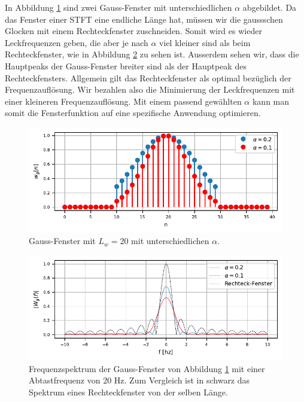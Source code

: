 In Abbildung \ref{sonogramm:gausstime} sind zwei Gauss-Fenster mit unterschiedlichen 
$\alpha$ abgebildet.
Da das Fenster einer STFT eine endliche Länge hat, müssen wir die gaussschen Glocken 
mit einem Rechteckfenster zuschneiden. 
Somit wird es wieder Leckfrequenzen geben, die aber je nach $\alpha$ viel kleiner sind
als beim Rechteckfenster, wie in Abbildung \ref{sonogramm:gaussfreq} zu sehen ist.
Ausserdem sehen wir, dass die Hauptpeaks der Gauss-Fenster breiter sind als der 
Hauptpeak des Rechteckfensters.
Allgemein gilt das Rechteckfenster als optimal bezüglich der Frequenzauflösung.
Wir bezahlen also die Minimierung der Leckfrequenzen mit einer kleineren Frequenzauflösung. 
Mit einem passend gewählten $\alpha$ kann man somit die Fensterfunktion auf eine spezifische
Anwendung optimieren.

\begin{figure}
    \centering
    \includegraphics{papers/sonogramm/images/gauss_time.pdf}
    \caption{Gauss-Fenster mit $L_w = 20$ mit unterschiedlichen $\alpha$.
    \label{sonogramm:gausstime}
    }
\end{figure}

\begin{figure}
    \centering
    \includegraphics{papers/sonogramm/images/gauss_freq.pdf}
    \caption{Frequenzspektrum der Gauss-Fenster von Abbildung \ref{sonogramm:gausstime}
    mit einer Abtastfrequenz von 20 Hz. Zum Vergleich ist in schwarz das Spektrum eines Rechteckfenster 
    von der selben Länge.
    \label{sonogramm:gaussfreq}
    }
\end{figure}

